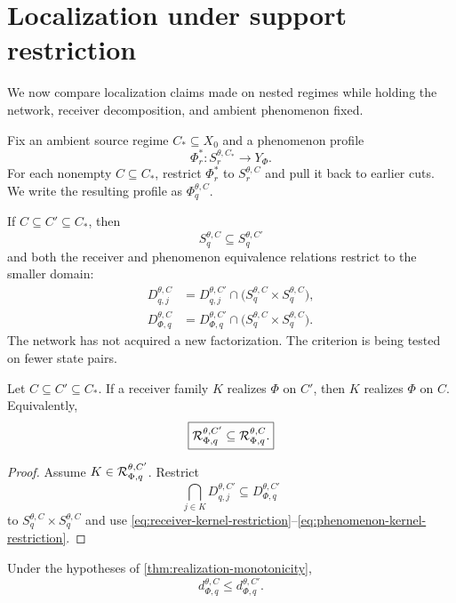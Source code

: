 \section{Localization under support restriction}
\label{sec:support-restriction}

We now compare localization claims made on nested regimes while holding the network, receiver decomposition, and ambient phenomenon fixed.

Fix an ambient source regime $C_\ast\subseteq X_0$ and a phenomenon profile
\[
\Phi_r^{\ast}:S_r^{\theta,C_\ast}\to Y_\Phi.
\]
For each nonempty $C\subseteq C_\ast$, restrict $\Phi_r^{\ast}$ to $S_r^{\theta,C}$ and pull it back to earlier cuts. We write the resulting profile as $\Phi_q^{\theta,C}$.

If $C\subseteq C'\subseteq C_\ast$, then
\[
S_q^{\theta,C}\subseteq S_q^{\theta,C'}
\]
and both the receiver and phenomenon equivalence relations restrict to the smaller domain:
\begin{align}
D_{q,j}^{\theta,C}
&=
D_{q,j}^{\theta,C'}
\cap
\bigl(S_q^{\theta,C}\times S_q^{\theta,C}\bigr),
\label{eq:receiver-kernel-restriction}\\
D_{\Phi,q}^{\theta,C}
&=
D_{\Phi,q}^{\theta,C'}
\cap
\bigl(S_q^{\theta,C}\times S_q^{\theta,C}\bigr).
\label{eq:phenomenon-kernel-restriction}
\end{align}
The network has not acquired a new factorization. The criterion is being tested on fewer state pairs.

\begin{theorem}
\label{thm:realization-monotonicity}
Let $C\subseteq C'\subseteq C_\ast$. If a receiver family $K$ realizes $\Phi$ on $C'$, then $K$ realizes $\Phi$ on $C$. Equivalently,
\begin{equation}
\boxed{
\mathcal{R}_{\Phi,q}^{\theta,C'}
\subseteq
\mathcal{R}_{\Phi,q}^{\theta,C}.
}
\label{eq:realization-family-monotonicity}
\end{equation}
\end{theorem}

\begin{proof}
Assume $K\in\mathcal{R}_{\Phi,q}^{\theta,C'}$. Restrict
\[
\bigcap_{j\in K}D_{q,j}^{\theta,C'}
\subseteq
D_{\Phi,q}^{\theta,C'}
\]
to $S_q^{\theta,C}\times S_q^{\theta,C}$ and use \eqref{eq:receiver-kernel-restriction}--\eqref{eq:phenomenon-kernel-restriction}.
\end{proof}

\begin{corollary}
\label{cor:order-monotonicity}
Under the hypotheses of \cref{thm:realization-monotonicity},
\begin{equation}
\boxed{
 d_{\Phi,q}^{\theta,C}
\le
 d_{\Phi,q}^{\theta,C'}.
}
\label{eq:order-monotonicity}
\end{equation}
\end{corollary}

